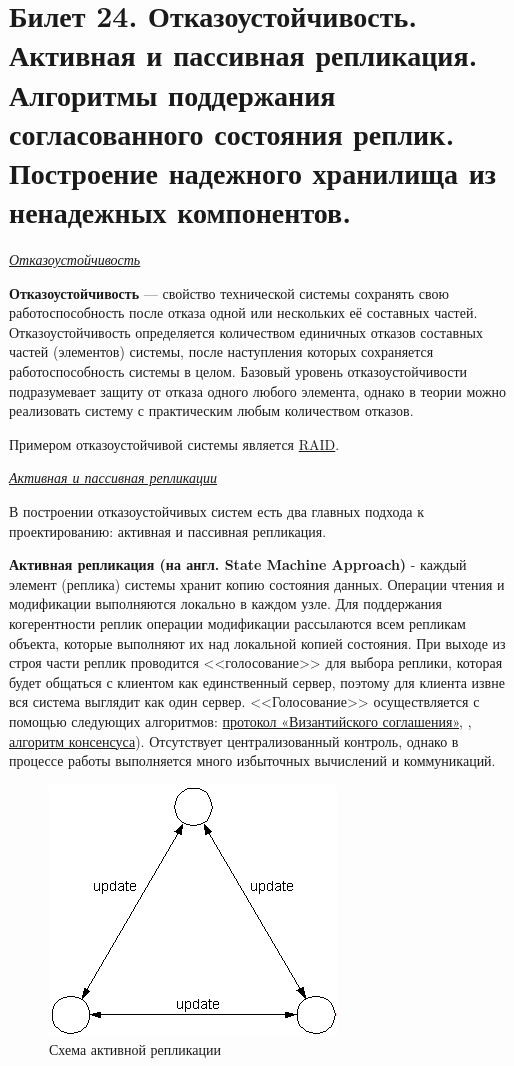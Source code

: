 \newpage
\section{Билет 24. Отказоустойчивость. Активная и пассивная репликация. Алгоритмы поддержания согласованного состояния реплик. Построение надежного хранилища из ненадежных компонентов.}

\begin{center}
	\textit{\underline{Отказоустойчивость}}
\end{center}

\textbf{Отказоустойчивость} — свойство технической системы сохранять свою работоспособность после отказа одной или нескольких её составных частей. Отказоустойчивость определяется количеством единичных отказов составных частей (элементов) системы, после наступления которых сохраняется работоспособность системы в целом. Базовый уровень отказоустойчивости подразумевает защиту от отказа одного любого элемента, однако в теории можно реализовать систему с практическим любым количеством отказов.

Примером отказоустойчивой системы является \href{https://ru.wikipedia.org/wiki/RAID}{RAID}.


\begin{center}
	\textit{\underline{Активная и пассивная репликации}}
\end{center}

В построении отказоустойчивых систем есть два главных подхода к проектированию: активная и пассивная репликация.

\textbf{Активная репликация (на англ. State Machine Approach)} - каждый элемент (реплика) системы хранит копию состояния данных. Операции чтения и модификации выполняются локально в каждом узле. Для поддержания когерентности реплик операции модификации рассылаются всем репликам объекта, которые выполняют их над локальной копией состояния. При выходе из строя части реплик проводится <<голосование>> для выбора реплики, которая будет общаться с клиентом как единственный сервер, поэтому для клиента извне вся система выглядит как один сервер. <<Голосование>> осуществляется с помощью следующих алгоритмов: \href{https://clck.ru/JVS7z}{протокол «Византийского соглашения»}, , \href{https://clck.ru/q62LJ}{алгоритм консенсуса}). Отсутствует централизованный контроль, однако в процессе работы выполняется много избыточных вычислений и коммуникаций.
\begin{figure}[H]
	\centering
	\includegraphics[scale = 0.7]{24/active.png}
	\caption{Схема активной репликации}
	\label{fig:active_repl}
\end{figure}

